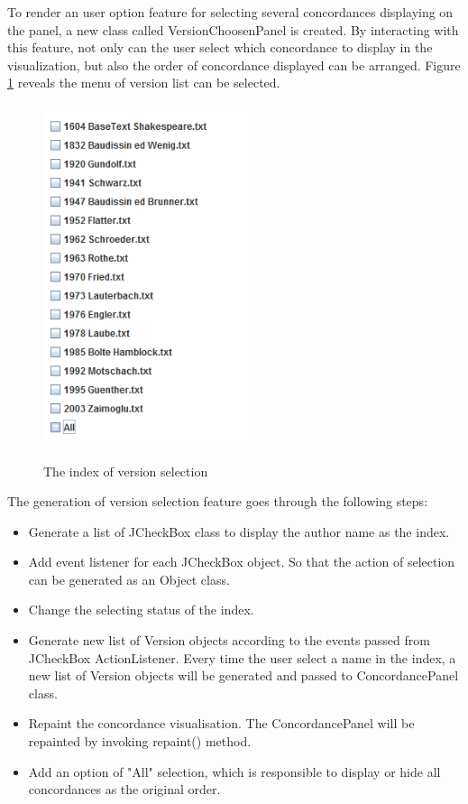 To render an user option feature for selecting several concordances displaying on the panel, a new class called VersionChoosenPanel is created. By interacting with this feature, not only can the user select which concordance to display in the visualization, but also the order of concordance displayed can be arranged. Figure
\ref{fig:versionChoosPanel} reveals the menu of version list can be selected. 
\begin{figure}[h]
	\centering	
	\includegraphics[width=6cm, height=10cm]{Figs/VersionChoosePanel}\\[1ex]
	\caption{The index of version selection}
	\label{fig:versionChoosPanel}
\end{figure} 

The generation of version selection feature goes through the following steps:
\begin{itemize}
	\item \textbf{} Generate a list of JCheckBox class to display the author name as the index. 
	\item \textbf{} Add event listener for each JCheckBox object. So that the action of selection can be generated as an Object class.
	\item \textbf{} Change the selecting status of the index. 
	\item \textbf{} Generate new list of Version objects according to the events passed from JCheckBox ActionListener. Every time the user select a name in the index, a new list of Version objects will be generated and passed to ConcordancePanel class. 
	\item \textbf{} Repaint the concordance visualisation. The ConcordancePanel will be repainted by invoking repaint() method.
	\item \textbf{} Add an option of "All" selection, which is responsible to display or hide all concordances as the original order.
\end{itemize}

